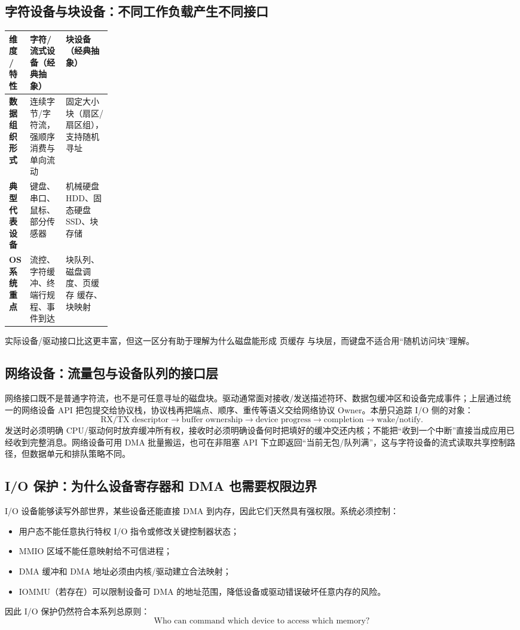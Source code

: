 \documentclass[UTF8,fontset=fandol,11pt,a4paper]{ctexart}
\begin{document}
\subsection{字符设备与块设备：不同工作负载产生不同接口}
\begingroup
\small
\renewcommand{\arraystretch}{1.25}
\setlength{\tabcolsep}{6pt}
\begin{tabularx}{\linewidth}{>{\bfseries}p{0.2\linewidth} X X}
\toprule
维度 / 特性 & 字符/流式设备（经典抽象） & 块设备（经典抽象） \\
\midrule
数据组织形式 & 连续字节/字符流，强顺序消费与单向流动 & 固定大小块（扇区/扇区组），支持随机寻址 \\
典型代表设备 & 键盘、串口、鼠标、部分传感器 & 机械硬盘 HDD、固态硬盘 SSD、块存储 \\
OS 系统重点 & 流控、字符缓冲、终端行规程、事件到达 & 块队列、磁盘调度、页缓存 缓存、块映射 \\
\bottomrule
\end{tabularx}
\endgroup
实际设备/驱动接口比这更丰富，但这一区分有助于理解为什么磁盘能形成 页缓存 与块层，而键盘不适合用“随机访问块”理解。

\subsection{网络设备：流量包与设备队列的接口层}
网络接口既不是普通字符流，也不是可任意寻址的磁盘块。驱动通常面对接收/发送描述符环、数据包缓冲区和设备完成事件；上层通过统一的网络设备 API 把包提交给协议栈，协议栈再把端点、顺序、重传等语义交给网络协议 Owner。本册只追踪 I/O 侧的对象：
\[
\text{RX/TX descriptor}\to\text{buffer ownership}\to\text{device progress}\to\text{completion}\to\text{wake/notify}.
\]
发送时必须明确 CPU/驱动何时放弃缓冲所有权，接收时必须明确设备何时把填好的缓冲交还内核；不能把“收到一个中断”直接当成应用已经收到完整消息。网络设备可用 DMA 批量搬运，也可在非阻塞 API 下立即返回“当前无包/队列满”，这与字符设备的流式读取共享控制路径，但数据单元和排队策略不同。

\subsection{I/O 保护：为什么设备寄存器和 DMA 也需要权限边界}
I/O 设备能够读写外部世界，某些设备还能直接 DMA 到内存，因此它们天然具有强权限。系统必须控制：
\begin{itemize}
  \item 用户态不能任意执行特权 I/O 指令或修改关键控制器状态；
  \item MMIO 区域不能任意映射给不可信进程；
  \item DMA 缓冲和 DMA 地址必须由内核/驱动建立合法映射；
  \item IOMMU（若存在）可以限制设备可 DMA 的地址范围，降低设备或驱动错误破坏任意内存的风险。
\end{itemize}
因此 I/O 保护仍然符合本系列总原则：
\[
\boxed{\text{Who can command which device to access which memory?}}
\]
\end{document}
